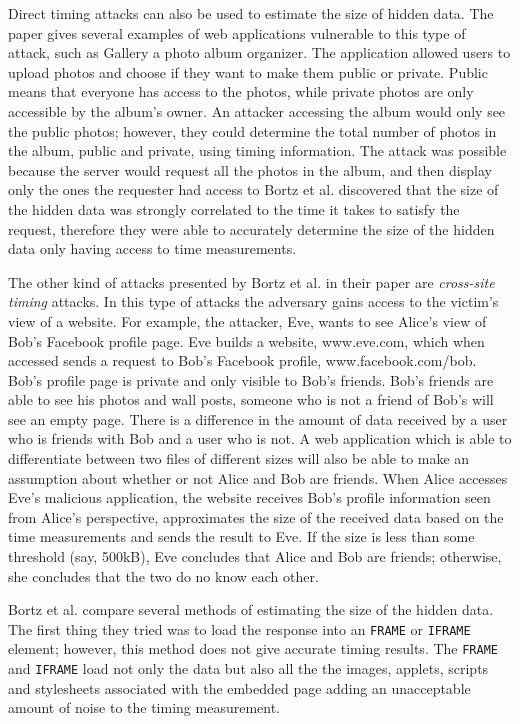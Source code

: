 \documentclass[10pt,a4paper,twoside]{book}
\begin{document}
Direct timing attacks can also be used to estimate the size of hidden data. The paper gives several examples of web applications vulnerable to this type of attack, such as Gallery\cite{gallery} a photo album organizer. The application allowed users to upload photos and choose if they want to make them public or private. Public means that everyone has access to the photos, while private photos are only accessible by the album's owner. An attacker accessing the album would only see the public photos; however, they could determine the total number of photos in the album, public and private, using timing information. The attack was possible because the server would request all the photos in the album, and then display only the ones the requester had access to Bortz et al. \cite{bortz2007exposing} discovered that the size of the hidden data was strongly correlated to the time it takes to satisfy the request, therefore they were able to accurately determine the size of the hidden data only having access to time measurements. 

The other kind of attacks presented by Bortz et al. \cite{bortz2007exposing} in their paper are \textit{cross-site timing} attacks. In this type of attacks the adversary gains access to the victim's view of a website. For example, the attacker, Eve, wants to see Alice's view of Bob's Facebook profile page. Eve builds a website, www.eve.com, which when accessed sends a request to Bob's Facebook profile, www.facebook.com/bob. Bob's profile page is private and only visible to Bob's friends. Bob's friends are able to see his photos and wall posts, someone who is not a friend of Bob's will see an empty page. There is a difference in the amount of data received by a user who is friends with Bob and a user who is not. A web application which is able to differentiate between two files of different sizes will also be able to make an assumption about whether or not Alice and Bob are friends. When Alice accesses Eve's malicious application, the website receives Bob's profile information seen from Alice's perspective, approximates the size of the received data based on the time measurements and sends the result to Eve. If the size is less than some threshold (say, 500kB), Eve concludes that Alice and Bob are friends; otherwise, she concludes that the two do no know each other.

Bortz et al. \cite{bortz2007exposing} compare several methods of estimating the size of the hidden data. The first thing they tried was to load the response into an \texttt{FRAME} or \texttt{IFRAME} element; however, this method does not give accurate timing results. The \texttt{FRAME} and \texttt{IFRAME} load not only the data but also  all the the images, applets, scripts and stylesheets associated with the embedded page adding an unacceptable amount of noise to the timing measurement.
\end{document}
